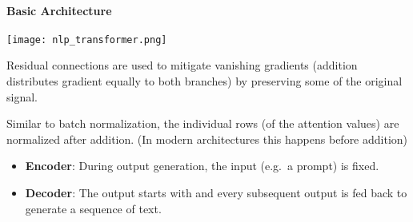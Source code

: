\paragraph{Basic Architecture}
\begin{center}
    \texttt{[image: nlp\_transformer.png]}
\end{center}

\newpar{}

Residual connections are used to mitigate vanishing gradients (addition distributes gradient equally to both branches) by preserving some of the original signal.

\newpar{}

Similar to batch normalization, the individual rows (of the attention values) are normalized after addition.
(In modern architectures this happens before addition)

\newpar{}
\begin{itemize}
    \item \textbf{Encoder}: During output generation, the input (e.g.\ a prompt) is fixed.
    \item \textbf{Decoder}: The output starts with  and every subsequent output is fed back to generate a sequence of text.
\end{itemize}

\newpar{}



